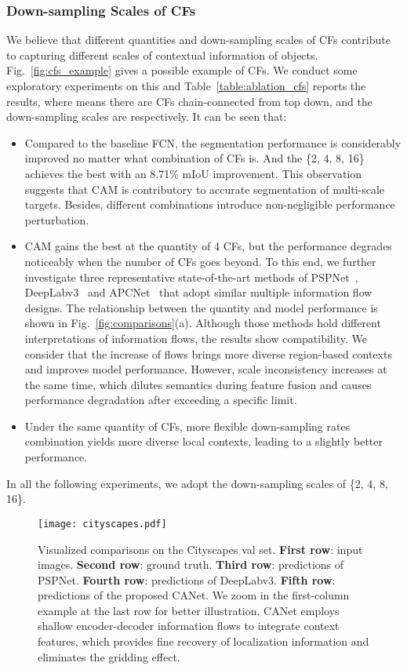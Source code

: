 \documentclass[journal]{IEEEtran}
\begin{document}
\subsubsection{Down-sampling Scales of CFs}
We believe that different quantities and down-sampling scales of CFs contribute to capturing different scales of contextual information of objects. Fig.~\ref{fig:cfs_example} gives a possible example of CFs. We conduct some exploratory experiments on this and Table~\ref{table:ablation_cfs} reports the results, where  means there are  CFs chain-connected from top down, and the down-sampling scales are   respectively. It can be seen that:
\begin{itemize}
    \item Compared to the baseline FCN, the segmentation performance is considerably improved no matter what combination of CFs is. And the \{2, 4, 8, 16\} achieves the best with an 8.71\% mIoU improvement. This observation suggests that CAM is contributory to accurate segmentation of multi-scale targets. Besides, different combinations introduce non-negligible performance perturbation. 
    \item CAM gains the best at the quantity of 4 CFs, but the performance degrades noticeably when the number of CFs goes beyond. To this end, we further investigate three representative state-of-the-art methods of PSPNet~\cite{zhao2017pyramid}, DeepLabv3~\cite{chen2017rethinking} and APCNet~\cite{he2019adaptive} that adopt similar multiple information flow designs. The relationship between the quantity and model performance is shown in Fig.~\ref{fig:comparisons}(a). Although those methods hold different interpretations of information flows, the results show compatibility. We consider that the increase of flows brings more diverse region-based contexts and improves model performance. However, scale inconsistency increases at the same time, which dilutes semantics during feature fusion and causes performance degradation after exceeding a specific limit.
    \item Under the same quantity of CFs, more flexible down-sampling rates combination yields more diverse local contexts, leading to a slightly better performance.
\end{itemize}

In all the following experiments, we adopt the down-sampling scales of \{2, 4, 8, 16\}.

\begin{figure*}
\begin{center}
\texttt{[image: cityscapes.pdf]}
\end{center}
\caption{Visualized comparisons on the Cityscapes val set. \textbf{First row}: input images. \textbf{Second row}: ground truth. \textbf{Third row}: predictions of PSPNet. \textbf{Fourth row}: predictions of DeepLabv3. \textbf{Fifth row}: predictions of the proposed CANet. We zoom in the first-column example at the last row for better illustration. CANet employs shallow encoder-decoder information flows to integrate context features, which provides fine recovery of localization information and eliminates the gridding effect.}
\label{fig:citysval}
\end{figure*}
\end{document}
